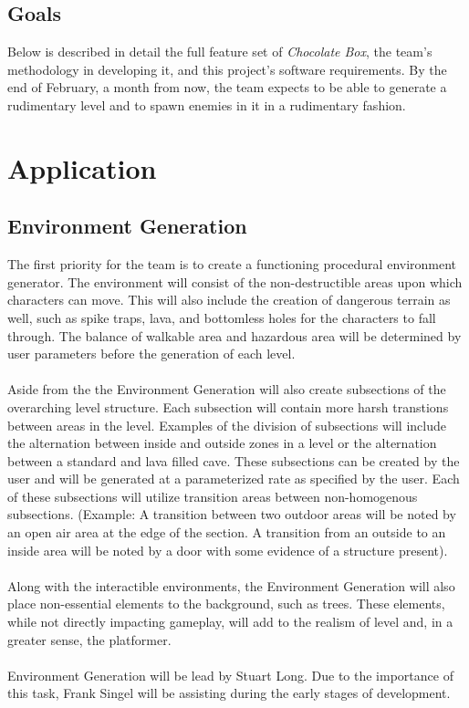 \documentclass[pdftex,12pt,letter]{article}
\begin{document}
\subsection{Goals}
Below is described in detail the full feature set of \textit{Chocolate Box}, the team's methodology in developing it, and this project's software requirements. By the end of February, a month from now, the team expects to be able to generate a rudimentary level and to spawn enemies in it in a rudimentary fashion.

\section{Application}
\subsection{Environment Generation}
The first priority for the team is to create a functioning procedural environment generator. The environment will consist of the non-destructible areas upon which characters can move. This will also include the creation of dangerous terrain as well, such as spike traps, lava, and bottomless holes for the characters to fall through. The balance of walkable area and hazardous area will be determined by user parameters before the generation of each level. 
\\\\
Aside from the the Environment Generation will also create subsections of the overarching level structure. Each subsection will contain more harsh transtions between areas in the level. Examples of the division of subsections will include the alternation between inside and outside zones in a level or the alternation between a standard and lava filled cave. These subsections can be created by the user and will be generated at a parameterized rate as specified by the user. Each of these subsections will utilize transition areas between non-homogenous subsections. (Example: A transition between two outdoor areas will be noted by an open air area at the edge of the section. A transition from an outside to an inside area will be noted by a door with some evidence of a structure present). 
\\\\
Along with the interactible environments, the Environment Generation will also place non-essential elements to the background, such as trees. These elements, while not directly impacting gameplay, will add to the realism of level and, in a greater sense, the platformer. 
\\\\
Environment Generation will be lead by Stuart Long. Due to the importance of this task, Frank Singel will be assisting during the early stages of development.
\end{document}
